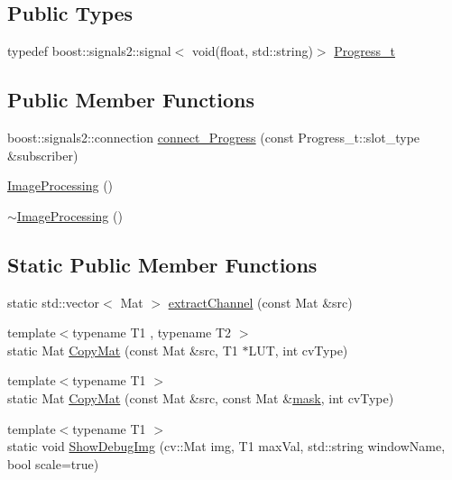 \subsection*{Public Types}
\begin{DoxyCompactItemize}
\item 
typedef boost\+::signals2\+::signal$<$ void(float, std\+::string)$>$ \hyperlink{class_vision_1_1_image_processing_ade0de8f6751f8d19b8fbb9533a009d3c}{Progress\+\_\+t}
\end{DoxyCompactItemize}
\subsection*{Public Member Functions}
\begin{DoxyCompactItemize}
\item 
boost\+::signals2\+::connection \hyperlink{class_vision_1_1_image_processing_a013b9623c6a2933ec5f78b13a450994d}{connect\+\_\+\+Progress} (const Progress\+\_\+t\+::slot\+\_\+type \&subscriber)
\item 
\hyperlink{class_vision_1_1_image_processing_a0090ffe36a912d6df5d7a1f507f6252e}{Image\+Processing} ()
\item 
\hyperlink{class_vision_1_1_image_processing_a1d4bd00ec1862112552c663034cebabc}{$\sim$\+Image\+Processing} ()
\end{DoxyCompactItemize}
\subsection*{Static Public Member Functions}
\begin{DoxyCompactItemize}
\item 
static std\+::vector$<$ Mat $>$ \hyperlink{class_vision_1_1_image_processing_ad5fa51caaabb8cb0fc2c15f645695a3c}{extract\+Channel} (const Mat \&src)
\item 
{\footnotesize template$<$typename T1 , typename T2 $>$ }\\static Mat \hyperlink{class_vision_1_1_image_processing_a16f96c26c7c5c6feb7ac103b9b478682}{Copy\+Mat} (const Mat \&src, T1 $\ast$L\+U\+T, int cv\+Type)
\item 
{\footnotesize template$<$typename T1 $>$ }\\static Mat \hyperlink{class_vision_1_1_image_processing_a5a255d7f5b10bcb199e66d1e00ab9d1a}{Copy\+Mat} (const Mat \&src, const Mat \&\hyperlink{_gen_blob_8m_a2f6787d513f2bdbca6833c1c1ee04329}{mask}, int cv\+Type)
\item 
{\footnotesize template$<$typename T1 $>$ }\\static void \hyperlink{class_vision_1_1_image_processing_a97407ef83de37496d30d6defe3165edd}{Show\+Debug\+Img} (cv\+::\+Mat img, T1 max\+Val, std\+::string window\+Name, bool scale=true)
\end{DoxyCompactItemize}
